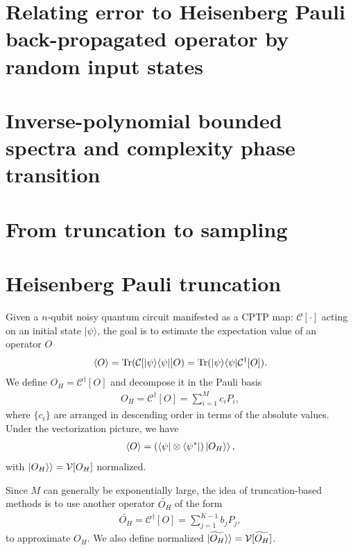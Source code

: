 \documentclass[showpacs,amsmath,amssymb,twocolumn,superscriptaddress,notitlepage,preprintnumbers,aps,pra,10pt,floatfix]{revtex4-2}
\begin{document}
\begin{appendix}
\section{Relating error to Heisenberg Pauli back-propagated operator by random input states}

\section{Inverse-polynomial bounded spectra and complexity phase transition}

\section{From truncation to sampling}

\section{Heisenberg Pauli truncation}
Given a $n$-qubit noisy quantum circuit manifested as a CPTP map: $\mathcal{C}[\cdot]$ acting on an initial state $|\psi\rangle$, the goal is to estimate the expectation value of an operator $O$
\begin{eqnarray}
\langle O\rangle=\mathrm{Tr}(\mathcal{C}[|\psi\rangle\langle \psi|]O)=\mathrm{Tr}(|\psi\rangle\langle \psi|\mathcal{C}^\dag[O]).
\end{eqnarray}
We define $O_H=\mathcal{C}^\dag[O]$ and decompose it in the Pauli basis
\begin{eqnarray}
O_H=\mathcal{C}^\dag[O]=\sum_{i=1}^M c_i P_i,
\end{eqnarray}
where $\{c_i\}$ are arranged in descending order in terms of the absolute values. Under the vectorization picture, we have
\begin{eqnarray}\label{b3}
\langle O\rangle=(\langle \psi|\otimes \langle \psi^*|)\ket{O_H\rangle},
\end{eqnarray}
with $\ket{O_H\rangle}=\mathcal{V}[O_H]$ normalized.

Since $M$ can generally be exponentially large, the idea of truncation-based methods is to use another operator $\widetilde{O_H}$ of the form
\begin{eqnarray}
\widetilde{O_H}=\mathcal{C}^\dag[O]=\sum_{j=1}^{K-1} b_j P_j,
\end{eqnarray}
to approximate $O_H$. We also define normalized $\ket{\widetilde{O_H}\rangle}=\mathcal{V}[\widetilde{O_H}]$.


\end{appendix}
\end{document}

